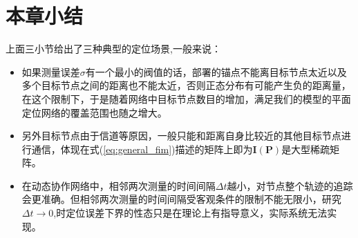 \section{本章小结}\label{section:model_discussion}
上面三小节给出了三种典型的定位场景,一般来说：
\begin{itemize}
  \item 如果测量误差$\sigma$有一个最小的阀值的话，部署的锚点不能离目标节点太近以及多个目标节点之间的距离也不能太近，否则正态分布有可能产生负的距离量，在这个限制下，于是随着网络中目标节点数目的增加，满足我们的模型的平面定位网络的覆盖范围也随之增大。
  \item 另外目标节点由于信道等原因，一般只能和距离自身比较近的其他目标节点进行通信，体现在式(\ref{eq:general_fim})描述的矩阵上即为$\bm{I}(\bm{P})$是大型稀疏矩阵。
  \item 在动态协作网络中，相邻两次测量的时间间隔$\Delta t$越小，对节点整个轨迹的追踪会更准确。但相邻两次测量的时间间隔受客观条件的限制不能无限小，研究$\Delta t \to 0$,时定位误差下界的性态只是在理论上有指导意义，实际系统无法实现。
\end{itemize}
